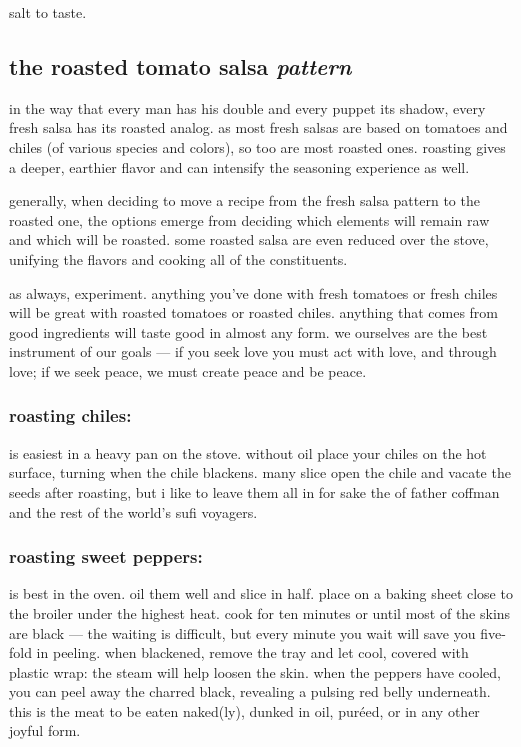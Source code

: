 salt to taste.


\subsection{the roasted tomato salsa \textit{pattern}}

in the way that every man has his double and every puppet its shadow, every 
fresh salsa has its roasted analog. as most fresh salsas are based on tomatoes 
and chiles (of various species and colors), so too are most roasted ones. 
roasting gives a deeper, earthier flavor and can intensify the seasoning 
experience as well.

generally, when deciding to move a recipe from the fresh salsa pattern to the 
roasted one, the options emerge from deciding which elements will remain raw 
and which will be roasted. some roasted salsa are even reduced over the stove, 
unifying the flavors and cooking all of the constituents.

as always, experiment. anything you've done with fresh tomatoes or fresh 
chiles will be great with roasted tomatoes or roasted chiles. anything that 
comes from good ingredients will taste good in almost any form. we ourselves 
are the best instrument of our goals --- if you seek love you must act with 
love, and through love; if we seek peace, we must create peace and be peace.

\subsubsection{roasting chiles:}
is easiest in a heavy pan on the stove. without oil place your chiles on the 
hot surface, turning when the chile blackens. many slice open the chile and 
vacate the seeds after roasting, but i like to leave them all in for sake the 
of father coffman and the rest of the world's sufi voyagers.

\subsubsection{roasting sweet peppers:}
is best in the oven. oil them well and slice in half. place on a baking sheet 
close to the broiler under the highest heat. cook for ten minutes or until 
most of the skins are black --- the waiting is difficult, but every minute you 
wait will save you five-fold in peeling. when blackened, remove the tray and 
let cool, covered with plastic wrap: the steam will help loosen the skin. when 
the peppers have cooled, you can peel away the charred black, revealing a 
pulsing red belly underneath. this is the meat to be eaten naked(ly), dunked 
in oil, pur\'{e}ed, or in any other joyful form.

